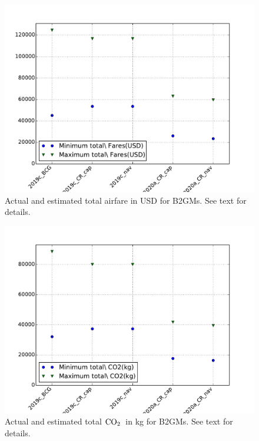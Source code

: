 \documentclass[12pt]{article}
\newcommand{\COtwo}{${\rm CO}_2$}
\begin{document}
\begin{figure}[htbp]
\begin{center}
\includegraphics[width=\textwidth]{../FIGURES/Shifts_Fares.pdf}
\caption{Actual and estimated total airfare in USD for B2GMs. See text for details.}
\label{fig:Shifts_fares}
\end{center}
\end{figure}

\begin{figure}[htbp]
\begin{center}
\includegraphics[width=\textwidth]{../FIGURES/Shifts_CO2.pdf}
\caption{Actual and estimated total \COtwo\ in kg for B2GMs. See text for details.}
\label{fig:Shifts_COtwo}
\end{center}
\end{figure}
\end{document}
